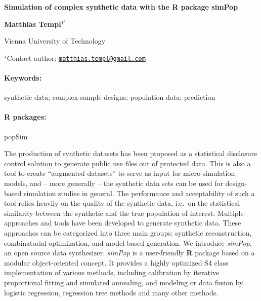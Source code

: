 \documentclass[11pt, a4paper]{article}
\renewcommand{\title}[1]{\begin{center}{\bf \LARGE #1}\end{center}}
\newcommand{\keywords}{\paragraph{Keywords:}}
\newcommand{\packages}{\paragraph{R packages:}}
\begin{document}
\pagestyle{empty}

\title{Simulation of complex synthetic data with the R package simPop}

\begin{center}
  {\bf Matthias Templ$^{1^\star}$}
\end{center}

\vskip 0.3cm

\begin{affiliations}
\begin{enumerate}
\begin{minipage}{0.915\textwidth}
\centering
\item Vienna University of Technology \\[-2pt]
\end{minipage}
\end{enumerate}
$^\star$Contact author: \href{mailto:matthias.templ@gmail.com}{\nolinkurl{matthias.templ@gmail.com}}\\
\end{affiliations}

\vskip 0.5cm

\begin{minipage}{0.915\textwidth}
\keywords synthetic data; complex sample designs; population data; prediction
\packages popSim
\end{minipage}

\vskip 0.8cm

The production of synthetic datasets has been proposed as a statistical
disclosure control solution to generate public use files out of
protected data. This is also a tool to create ``augmented datasets'' to
serve as input for micro-simulation models, and -- more generally -- the
synthetic data sets can be used for design-based simulation studies in
general. The performance and acceptability of such a tool relies heavily
on the quality of the synthetic data, i.e.~on the statistical similarity
between the synthetic and the true population of interest. Multiple
approaches and tools have been developed to generate synthetic data.
These approaches can be categorized into three main groups: synthetic
reconstruction, combinatorial optimization, and model-based generation.
We introduce \emph{simPop}, an open source data synthesizer.
\emph{simPop} is a user-friendly \textbf{R} package based on a modular
object-oriented concept. It provides a highly optimized S4 class
implementation of various methods, including calibration by iterative
proportional fitting and simulated annealing, and modeling or data
fusion by logistic regression, regression tree methods and many other
methods.
\end{document}
